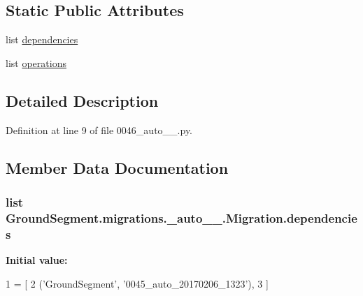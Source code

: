 \subsection*{Static Public Attributes}
\begin{DoxyCompactItemize}
\item 
list \hyperlink{class_ground_segment_1_1migrations_1_10046__auto__20170207__1208_1_1_migration_ad580c4718bd025538990fb85fa83f64d}{dependencies}
\item 
list \hyperlink{class_ground_segment_1_1migrations_1_10046__auto__20170207__1208_1_1_migration_a1c1c543acc9079dd174b66bd24c6f165}{operations}
\end{DoxyCompactItemize}


\subsection{Detailed Description}


Definition at line 9 of file 0046\+\_\+auto\+\_\+\_.\+py.



\subsection{Member Data Documentation}
\hypertarget{class_ground_segment_1_1migrations_1_10046__auto__20170207__1208_1_1_migration_ad580c4718bd025538990fb85fa83f64d}{}
\subsubsection[{dependencies}]{\setlength{\rightskip}{0pt plus 5cm}list Ground\+Segment.\+migrations.\+\_\+auto\+\_\+\_.\+Migration.\+dependencies\hspace{0.3cm}{\ttfamily [static]}}\label{class_ground_segment_1_1migrations_1_10046__auto__20170207__1208_1_1_migration_ad580c4718bd025538990fb85fa83f64d}
{\bfseries Initial value\+:}
\begin{DoxyCode}
1 = [
2         (\textcolor{stringliteral}{'GroundSegment'}, \textcolor{stringliteral}{'0045\_auto\_20170206\_1323'}),
3     ]
\end{DoxyCode}


